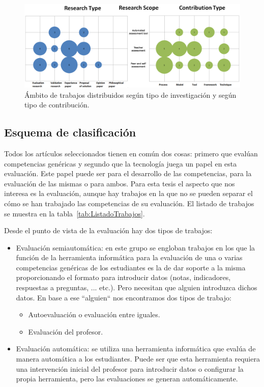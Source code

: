 \pagestyle{empty}
\begin{landscape}
\begin{figure}[H]
  \begin{center}
    \includegraphics[scale=0.4]{Burbujas.png}
  \end{center}
  \caption{Ámbito de trabajos distribuidos según tipo de investigación y según tipo de contribución.}
  \label{fig:Burble}
\end{figure}
\end{landscape}
\pagestyle{fancy}


\subsection{Esquema de clasificación}

Todos los artículos seleccionados tienen en común dos cosas: primero que evalúan competencias genéricas y segundo que la tecnología juega un papel en esta evaluación. Este papel puede ser para el desarrollo de las competencias, para la evaluación de las mismas o para ambos. Para esta tesis el aspecto que nos interesa es la evaluación, aunque hay trabajos en la que no se pueden separar el cómo se han trabajado las competencias de su evaluación. El listado de trabajos se muestra en la tabla~\ref{tab:ListadoTrabajos}.

Desde el punto de vista de la evaluación hay dos tipos de trabajos:
\begin{itemize}
\item Evaluación semiautomática: en este grupo se engloban trabajos en los que la función de la herramienta informática para la evaluación de una o varias competencias genéricas de los estudiantes es la de dar soporte a la misma proporcionando el formato para introducir datos (notas, indicadores, respuestas a preguntas, ... etc.). Pero necesitan que alguien introduzca dichos datos. En base a ese ``alguien`` nos encontramos dos tipos de trabajo:
	\begin{itemize}
		\item Autoevaluación o evaluación entre iguales.
		\item Evaluación del profesor.
	\end{itemize}
\item Evaluación automática:  se utiliza una herramienta informática que evalúa de manera automática a los estudiantes. Puede ser que esta herramienta requiera una intervención inicial del profesor para introducir datos o configurar la propia herramienta, pero las evaluaciones se generan automáticamente.
\end{itemize}

